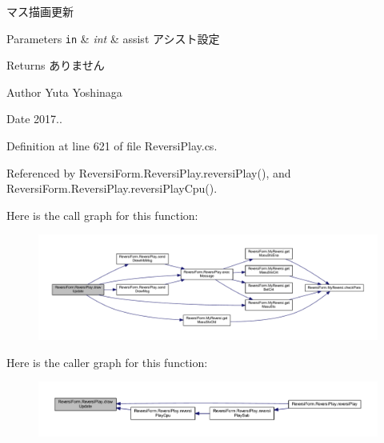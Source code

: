 マス描画更新 


\begin{DoxyParams}[1]{Parameters}
\mbox{\tt in}  & {\em int} & assist アシスト設定 \\
\hline
\end{DoxyParams}
\begin{DoxyReturn}{Returns}
ありません 
\end{DoxyReturn}
\begin{DoxyAuthor}{Author}
Yuta Yoshinaga 
\end{DoxyAuthor}
\begin{DoxyDate}{Date}
2017.. 
\end{DoxyDate}


Definition at line 621 of file Reversi\+Play.\+cs.



Referenced by Reversi\+Form.\+Reversi\+Play.\+reversi\+Play(), and Reversi\+Form.\+Reversi\+Play.\+reversi\+Play\+Cpu().

Here is the call graph for this function\+:
\nopagebreak
\begin{figure}[H]
\begin{center}
\leavevmode
\includegraphics[width=350pt]{class_reversi_form_1_1_reversi_play_af1415f15759ba8475b4b5afca3a35017_cgraph}
\end{center}
\end{figure}
Here is the caller graph for this function\+:
\nopagebreak
\begin{figure}[H]
\begin{center}
\leavevmode
\includegraphics[width=350pt]{class_reversi_form_1_1_reversi_play_af1415f15759ba8475b4b5afca3a35017_icgraph}
\end{center}
\end{figure}
\mbox{\label{class_reversi_form_1_1_reversi_play_accc1d553ba6a6c2a5f0c58316b40a183}} 
